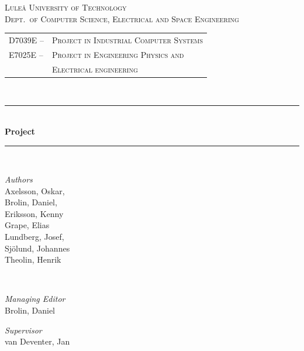 \newcommand{\HRule}{\rule{\linewidth}{0.5mm}}
\center %


\textsc{\LARGE Luleå University of Technology}\\[1.5cm] %

\textsc{\Large Dept.\ of Computer Science, Electrical and Space Engineering}\\[0.5cm] %

\begin{centering}
\begin{tabular}{l l}
\textsc{\large D7039E --}	& \textsc{\large Project in Industrial Computer Systems}\\ %
\textsc{\large E7025E --}	& \textsc{\large Project in Engineering Physics and}\\
				& \textsc{\large Electrical engineering} %
\end{tabular}
\end{centering}\\[0.5cm]

\HRule\\[0.8cm]

{\huge\bfseries Project \project}\\[0.4cm] %

\HRule\\[1.5cm]

\begin{minipage}{0.4\textwidth}
	\begin{flushleft}
		\large
		\emph{Authors}\\
		Axelsson, Oskar, \\ 
		Brolin, Daniel, \\ 
		Eriksson, Kenny \\ 
		Grape, Elias \\ 
		Lundberg, Josef, \\ 
		Sjölund, Johannes \\
		Theolin, Henrik\\
	\end{flushleft}
\end{minipage}
~
\begin{minipage}{0.4\textwidth}
	\begin{flushright}
		\large
		\textit{Managing Editor}\\
		Brolin, Daniel
	\end{flushright}
	\begin{flushright}
		\large
		\textit{Supervisor}\\
		van Deventer, Jan
	\end{flushright}
\end{minipage}

